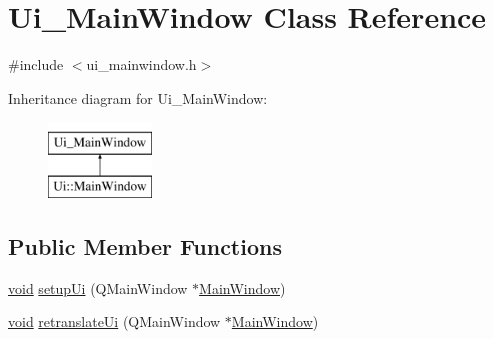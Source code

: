 \hypertarget{class_ui___main_window}{\section{Ui\-\_\-\-Main\-Window Class Reference}
\label{class_ui___main_window}
}


{\ttfamily \#include $<$ui\-\_\-mainwindow.\-h$>$}

Inheritance diagram for Ui\-\_\-\-Main\-Window\-:\begin{figure}[H]
\begin{center}
\leavevmode
\includegraphics[height=2.000000cm]{class_ui___main_window}
\end{center}
\end{figure}
\subsection*{Public Member Functions}
\begin{DoxyCompactItemize}
\item 
\hyperlink{group___u_a_v_objects_plugin_ga444cf2ff3f0ecbe028adce838d373f5c}{void} \hyperlink{class_ui___main_window_acf4a0872c4c77d8f43a2ec66ed849b58}{setup\-Ui} (Q\-Main\-Window $\ast$\hyperlink{class_main_window}{Main\-Window})
\item 
\hyperlink{group___u_a_v_objects_plugin_ga444cf2ff3f0ecbe028adce838d373f5c}{void} \hyperlink{class_ui___main_window_a097dd160c3534a204904cb374412c618}{retranslate\-Ui} (Q\-Main\-Window $\ast$\hyperlink{class_main_window}{Main\-Window})
\end{DoxyCompactItemize}
